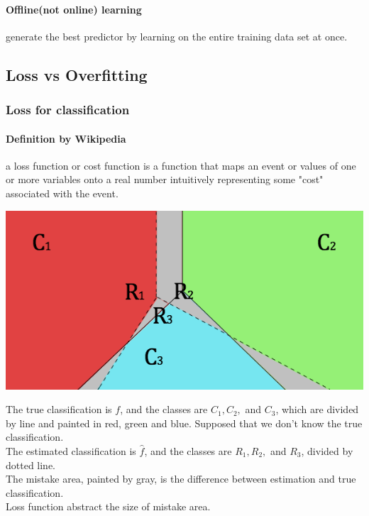 \documentclass{article}
\begin{document}
{{{        \paragraph{Offline(not online) learning}{
            generate the best predictor by learning on the entire training data set at once.
        }
    }
    \subsection{Loss vs Overfitting}{
        \subsubsection{Loss for classification}{
            \paragraph{Definition by Wikipedia}{
                a loss function or cost function is a function that maps an event or values of one or more variables onto a real number intuitively representing some "cost" associated with the event.
            }

            \begin{center}{
                
                \includegraphics{classification.png}
            }
            \end{center}

            The true classification is $f$, and the classes are $C_1, C_2,$ and $C_3$, which are divided by line and painted in red, green and blue. Supposed that we don't know the true classification.\\
            The estimated classification is \(\hat{f}\), and the classes are $R_1, R_2,$ and $R_3$, divided by dotted line.\\
            The mistake area, painted by gray, is the difference between estimation and true classification.\\
            Loss function abstract the size of mistake area.\\

}}}}
\end{document}
